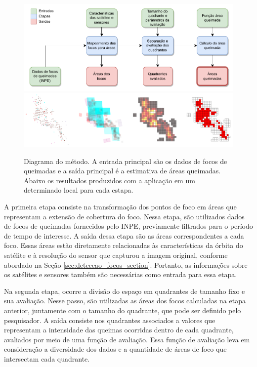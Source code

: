 \documentclass[cic,tc]{iiufrgs}
\begin{document}
\begin{figure}[H]
    \caption{Diagrama do método. A entrada principal são os dados de focos de queimadas e a saída principal é a estimativa de áreas queimadas. Abaixo os resultados produzidos com a aplicação em um determinado local para cada estapa.}
    \begin{center}
        \includegraphics[width=35em]{metodologica_workflow}
        \includegraphics[width=35em]{exemplo_metodo_completo}
    \end{center}
    \label{fig:metodologica_workflow}
\end{figure}

A primeira etapa consiste na transformação dos pontos de foco em áreas que representam a extensão de cobertura do foco. Nessa etapa, são utilizados dados de focos de queimadas fornecidos pelo INPE, previamente filtrados para o período de tempo de interesse. A saída dessa etapa são as áreas correspondentes a cada foco. Essas áreas estão diretamente relacionadas às características da órbita do satélite e à resolução do sensor que capturou a imagem original, conforme abordado na Seção \ref{sec:deteccao_focos_section}. Portanto, as informações sobre os satélites e sensores também são necessárias como entrada para essa etapa.

Na segunda etapa, ocorre a divisão do espaço em quadrantes de tamanho fixo e sua avaliação. Nesse passo, são utilizadas as áreas dos focos calculadas na etapa anterior, juntamente com o tamanho do quadrante, que pode ser definido pelo pesquisador. A saída consiste nos quadrantes associados a valores que representam a intensidade das queimas ocorridas dentro de cada quadrante, avaliados por meio de uma função de avaliação. Essa função de avaliação leva em consideração a diversidade dos dados e a quantidade de áreas de foco que intersectam cada quadrante.
\end{document}
